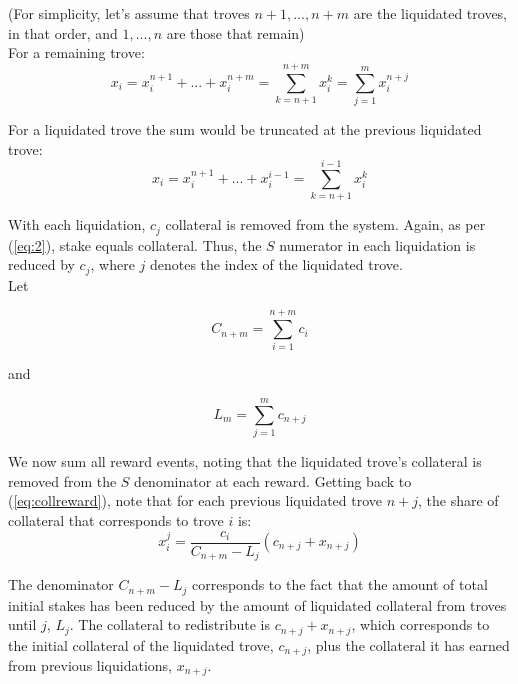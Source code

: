 \documentclass[reqno]{article}
\begin{document}
(For simplicity, let’s assume that troves $n+1, ..., n+m$ are the liquidated troves, in that order, and $1, ..., n$ are those that remain)\\

For a remaining trove:\\

\begin{equation} \label{eq:collreward}
  x_i = x_i^{n+1} + ... + x_i^{n+m} = \sum_{k=n+1}^{n+m}x_i^k = \sum_{j=1}^{m}x_i^{n+j}
\end{equation}

For a liquidated trove the sum would be truncated at the previous liquidated trove: \\

\begin{equation}
  x_i = x_i^{n+1} + ... + x_i^{i-1} = \sum_{k=n+1}^{i-1}x_i^k
\end{equation}

With each liquidation, $c_j$ collateral is removed from the system. Again, as per (\ref{eq:2}), stake equals collateral. Thus, the $S$ numerator in each liquidation is reduced by $c_j$, where $j$ denotes the index of the liquidated trove.\\ 


Let

\begin{equation} 
    C_{n+m}=\sum\limits^{n+m}_{i=1}c_i
\end{equation}

\bigskip
and

\begin{equation} 
    L_m=\sum\limits^m_{j=1}c_{n+j}
\end{equation}

\bigskip
We now sum all reward events, noting that the liquidated trove’s collateral is removed from the $S$ denominator at each reward. Getting back to (\ref{eq:collreward}), note that for each previous liquidated trove $n+j$, the share of collateral that corresponds to trove $i$ is: \\

\begin{equation} 
  x_i^j = \frac{c_i}{C_{n+m}-L_j}(c_{n+j}+x_{n+j})
\end{equation}

The denominator $C_{n+m}-L_j$ corresponds to the fact that the amount of total initial stakes has been reduced by the amount of liquidated collateral from  troves until $j$, $L_j$. The collateral to redistribute is $c_{n+j}+x_{n+j}$, which corresponds to the initial collateral of the liquidated trove, $c_{n+j}$, plus the collateral it has earned from previous liquidations, $x_{n+j}$. \\
\end{document}
